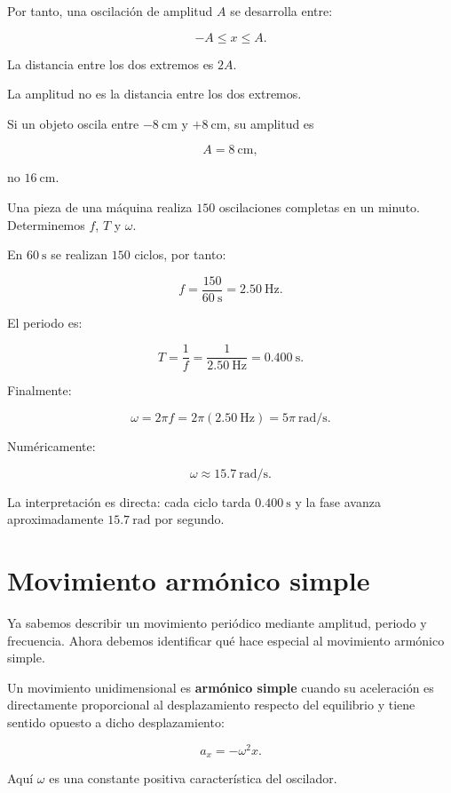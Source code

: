 Por tanto, una oscilación de amplitud \(A\) se desarrolla entre:

\[ -A\leq x\leq A. \]

La distancia entre los dos extremos es \(2A\).

\begin{errorfrecuente}
La amplitud no es la distancia entre los dos extremos.

Si un objeto oscila entre \(-\SI{8}{\centi\meter}\) y \(+\SI{8}{\centi\meter}\), su amplitud es

\[ A=\SI{8}{\centi\meter}, \]

no \(\SI{16}{\centi\meter}\).
\end{errorfrecuente}

\begin{ejemplo}
Una pieza de una máquina realiza \(150\) oscilaciones completas en un minuto. Determinemos \(f\), \(T\) y \(\omega\).

En \(\SI{60}{\second}\) se realizan \(150\) ciclos, por tanto:

\[ f=\frac{150}{\SI{60}{\second}}=\SI{2.50}{\hertz}. \]

El periodo es:

\[ T=\frac{1}{f}=\frac{1}{\SI{2.50}{\hertz}}=\SI{0.400}{\second}. \]

Finalmente:

\[ \omega=2\pi f=2\pi(\SI{2.50}{\hertz})=5\pi\ \si{\radian\per\second}. \]

Numéricamente:

\[ \boxed{\omega\approx\SI{15.7}{\radian\per\second}}. \]

La interpretación es directa: cada ciclo tarda \(\SI{0.400}{\second}\) y la fase avanza aproximadamente \(\SI{15.7}{\radian}\) por segundo.
\end{ejemplo}

\section{Movimiento armónico simple}

Ya sabemos describir un movimiento periódico mediante amplitud, periodo y frecuencia. Ahora debemos identificar qué hace especial al movimiento armónico simple.

\begin{definicion}
Un movimiento unidimensional es \textbf{armónico simple} cuando su aceleración es directamente proporcional al desplazamiento respecto del equilibrio y tiene sentido opuesto a dicho desplazamiento:

\[ \boxed{a_x=-\omega^2x}. \]

Aquí \(\omega\) es una constante positiva característica del oscilador.
\end{definicion}

